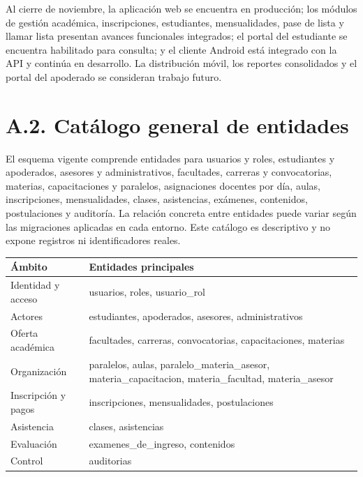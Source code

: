 \documentclass[12pt,a4paper,oneside]{report}
\begin{document}
Al cierre de noviembre, la aplicación web se encuentra en producción; los módulos de gestión académica, inscripciones, estudiantes, mensualidades, pase de lista y llamar lista presentan avances funcionales integrados; el portal del estudiante se encuentra habilitado para consulta; y el cliente Android está integrado con la API y continúa en desarrollo. La distribución móvil, los reportes consolidados y el portal del apoderado se consideran trabajo futuro.

\section*{A.2. Catálogo general de entidades}

El esquema vigente comprende entidades para usuarios y roles, estudiantes y apoderados, asesores y administrativos, facultades, carreras y convocatorias, materias, capacitaciones y paralelos, asignaciones docentes por día, aulas, inscripciones, mensualidades, clases, asistencias, exámenes, contenidos, postulaciones y auditoría. La relación concreta entre entidades puede variar según las migraciones aplicadas en cada entorno. Este catálogo es descriptivo y no expone registros ni identificadores reales.

\renewcommand{\arraystretch}{1.2}
\begin{longtable}{@{}>{\raggedright\arraybackslash}p{}>{\raggedright\arraybackslash}p{}@{}}
  \toprule
  \textbf{Ámbito} & \textbf{Entidades principales} \\
  \midrule
  \endhead
  Identidad y acceso & usuarios, roles, usuario\_rol \\
  Actores & estudiantes, apoderados, asesores, administrativos \\
  Oferta académica & facultades, carreras, convocatorias, capacitaciones, materias \\
  Organización & paralelos, aulas, paralelo\_materia\_asesor, materia\_capacitacion, materia\_facultad, materia\_asesor \\
  Inscripción y pagos & inscripciones, mensualidades, postulaciones \\
  Asistencia & clases, asistencias \\
  Evaluación & examenes\_de\_ingreso, contenidos \\
  Control & auditorias \\
  \bottomrule
\end{longtable}
\end{document}
